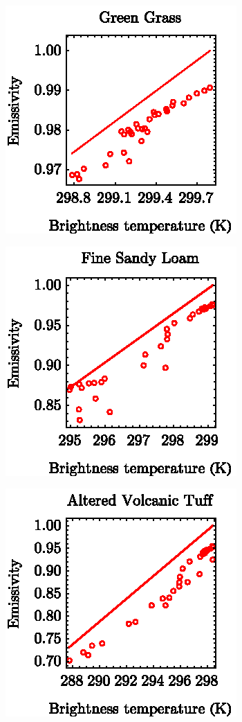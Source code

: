 \begin{figure}[!t]
	\centering
	\vspace{1em}
	\begin{subfigure}[t]{.3\linewidth}
		\centering
		\includegraphics[scale=1]{pics/Chapter_03/GreenGrass_Emiss2BrightTemp.eps}
		\caption{}
	\end{subfigure}
	\hspace{1em}
	\begin{subfigure}[t]{.3\linewidth}
		\centering
		\includegraphics[scale=1]{pics/Chapter_03/FineSandyLoam_Emiss2BrightTemp.eps}
		\caption{}
	\end{subfigure}
	\hspace{1em}
	\begin{subfigure}[t]{.3\linewidth}
		\centering
		\includegraphics[scale=1]{pics/Chapter_03/AlteredVolcanicTuff_Emiss2BrightTemp.eps}

\end{subfigure}
\end{figure}
